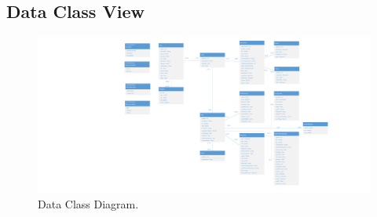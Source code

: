\begin{landscape}
\section{Data Class View}
	\begin{figure}[h!]
		\centering
		\includegraphics[width=0.8\linewidth]{./Iterazione 1/OtherFiles/UML - Data Class View}
		\caption{Data Class Diagram.}
		\label{fig:DataClassDiagram}
	\end{figure}
\end{landscape}